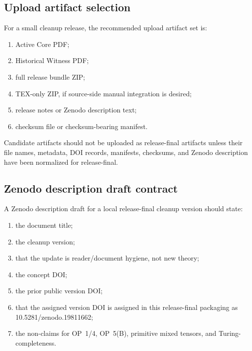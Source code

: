 \subsection{Upload artifact selection}
\label{subsec:v4014-upload-artifact-selection}

\begin{definition}
\label{def:v4014-recommended-upload-artifact-set}
For a small cleanup release, the recommended upload artifact set is:
\begin{enumerate}[leftmargin=*]
 \item Active Core PDF;
 \item Historical Witness PDF;
 \item full release bundle ZIP;
 \item TEX-only ZIP, if source-side manual integration is desired;
 \item release notes or Zenodo description text;
 \item checksum file or checksum-bearing manifest.
\end{enumerate}
\end{definition}

\begin{remark}
\label{rem:v4014-release-final state-artifacts-versus-release-final-artifacts}
Candidate artifacts should not be uploaded as release-final artifacts unless
their file names, metadata, DOI records, manifests, checksums, and Zenodo
description have been normalized for release-final.
\end{remark}

\subsection{Zenodo description draft contract}
\label{subsec:v4014-zenodo-description-draft-contract}

\begin{definition}
\label{def:v4014-zenodo-description-draft-contract}
A Zenodo description draft for a local release-final cleanup version should state:
\begin{enumerate}[leftmargin=*]
 \item the document title;
 \item the cleanup version;
 \item that the update is reader/document hygiene, not new theory;
 \item the concept DOI;
 \item the prior public version DOI;
 \item that the assigned version DOI is assigned in this release-final packaging as 10.5281/zenodo.19811662;
 \item the non-claims for OP~1/4, OP~5(B), primitive mixed tensors, and
 Turing-completeness.
\end{enumerate}
\end{definition}

